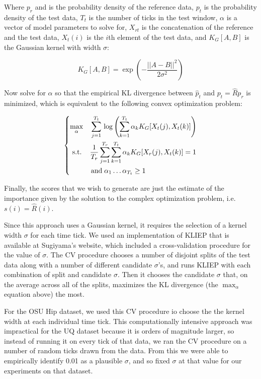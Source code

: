 Where $p_r$ and is the probability density of the reference data,
$p_t$ is the probability density of the test
data, $T_t$ is the number of ticks in the test window, $\alpha$ is a
vector of model parameters to solve for, $X_{rt}$ is the concatenation of the reference and the
test data, $X_t(i)$ is the $i$th element of the test data,
and $K_G[A,B]$ is the Gaussian kernel with width $\sigma$:

\[
K_G[A,B] = \exp \left(-\frac{||A-B||^2}{2\sigma^2}\right)
\]

Now solve for $\alpha$ so that the empirical KL divergence between $\hat{p}_t$ and
$p_t = \hat{R}p_r$ is minimized, which is equivalent to the following convex optimization
problem:

\[
\begin{dcases}
 \max_{\alpha} \quad \sum_{j=1}^{T_t} \, \log \left( \sum_{k=1}^{T_t} \alpha_k K_G[X_t(j), X_t(k)] \right) \\
 \,\, \text{s.t.} \quad\, \frac{1}{T_r} \sum_{j=1}^{T_r} \sum_{k=1}^{T_t} \alpha_k K_G[X_r(j),X_t(k)] = 1 \\
 \qquad \quad \text{and} \; \alpha_1 \ldots \alpha_{T_t} \ge 1
\end{dcases}
\]

Finally, the scores that we wish to generate are just the estimate of the importance given by the
solution to the complex optimization problem, i.e. $s(i) = \hat{R}(i)$.

Since this approach uses a Gaussian kernel, it requires the selection of
a kernel width $\sigma$ for each time tick. We used an implementation of
KLIEP that is available at Sugiyama's website, which included a cross-validation
procedure for the value of $\sigma$. The CV procedure chooses a number of disjoint
splits of the test data along with a number of different candidate $\sigma$'s, and runs
KLIEP with each combination of split and candidate $\sigma$. Then it chooses the candidate $\sigma$
that, on the average across all of the splits, maximizes the KL divergence (the
$\max_{\alpha}$ equation above) the most.

For the OSU Hip dataset, we used this CV procedure io choose the the kernel width at each individual time tick. This computationally
intensive approach was impractical for the UQ dataset because it is orders of magnitude larger,
so instead of running it on every tick of that data, we ran the CV procedure on a number of
random ticks drawn from the data. From this we were able
to empirically identify 0.01 as a plausible $\sigma$, and so fixed $\sigma$
at that value for our experiments on that dataset.


